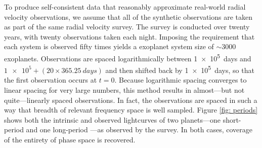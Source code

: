 \documentclass[12pt,manuscript]{aastex}
\begin{document}
To produce self-consistent data that reasonably approximate real-world radial velocity observations, we assume that all of the synthetic observations are taken as part of the same radial velocity survey.
The survey is conducted over twenty years, with twenty observations taken each night.
Imposing the requirement that each system is observed fifty times yields a exoplanet system size of $\sim 3000$ exoplanets. 
Observations are spaced logarithmically between \SI{1e5}{days} and $\num{1e5} + (20 \times \SI{365.25}{days})$ and then shifted back by \SI{1e5}{days}, so that the first observation occurs at $t=0$.
Because logarithmic spacing converges to linear spacing for very large numbers, this method results in almost---but not quite---linearly spaced observations.
In fact, the observations are spaced in such a way that breadth of relevant frequency space is well sampled. 
Figure \ref{fig: periods} shows both the intrinsic and observed lightcurves of two planets---one short-period and one long-period ---as observed by the survey.
In both cases, coverage of the entirety of phase space is recovered.
\end{document}
